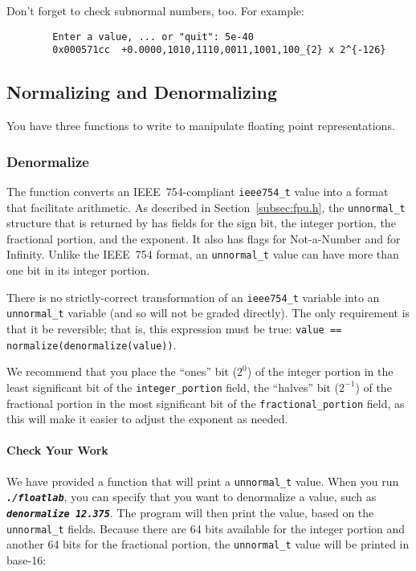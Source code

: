     Don't forget to check subnormal numbers, too.
    For example:

    \begin{verbatim}
        Enter a value, ... or "quit": 5e-40
        0x000571cc	+0.0000,1010,1110,0011,1001,100_{2} x 2^{-126}
    \end{verbatim}

    \subsection{Normalizing and Denormalizing}

    You have three functions to write to manipulate floating point representations.

    \subsubsection{Denormalize}

    The  function converts an IEEE~754-compliant \lstinline{ieee754_t} value into a format that facilitate arithmetic.
    As described in Section~\ref{subsec:fpu.h}, the \lstinline{unnormal_t} structure that is returned by  has fields for the sign bit, the integer portion, the fractional portion, and the exponent.
    It also has flags for Not-a-Number and for Infinity.
    Unlike the IEEE~754 format, an \lstinline{unnormal_t} value can have more than one bit in its integer portion.

    There is no strictly-correct transformation of an \lstinline{ieee754_t} variable into an \lstinline{unnormal_t} variable (and so  will not be graded directly).
    The only requirement is that it be reversible;
    that is, this expression must be true: \lstinline{value == normalize(denormalize(value))}.

    We recommend that you place the ``ones'' bit ($2^0$) of the integer portion in the least significant bit of the \lstinline{integer_portion} field, the ``halves'' bit ($2^{-1}$) of the fractional portion in the most significant bit of the \lstinline{fractional_portion} field, as this will make it easier to adjust the exponent as needed.

    \paragraph*{Check Your Work}

    We have provided a function that will print a \lstinline{unnormal_t} value.
    When you run \texttt{\textbf{\textit{./floatlab}}}, you can specify that you want to denormalize a value, such as \texttt{\textbf{\textit{denormalize 12.375}}}.
    The program will then print the value, based on the \lstinline{unnormal_t} fields.
    Because there are 64 bits available for the integer portion and another 64 bits for the fractional portion, the \lstinline{unnormal_t} value will be printed in base-16:

